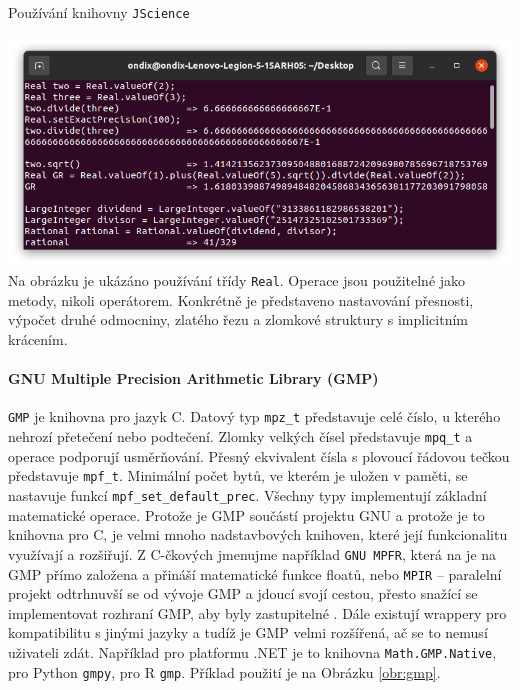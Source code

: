 \begin{myfigure}{}
\caption{Používání knihovny \texttt{JScience}}
\includegraphics[width=\linewidth]{./graphics/jscience.png}\label{obr:jscience}
Na obrázku je ukázáno používání třídy \texttt{Real}. Operace jsou použitelné jako metody, nikoli operátorem. Konkrétně je představeno nastavování přesnosti, výpočet druhé odmocniny, zlatého řezu a zlomkové struktury s implicitním krácením.
\end{myfigure}

\paragraph{GNU Multiple Precision Arithmetic Library \cite{wiki:gmp} (GMP)}
\texttt{GMP} je knihovna pro jazyk C. Datový typ \texttt{mpz\_t} představuje celé číslo, u kterého nehrozí přetečení nebo podtečení. Zlomky velkých čísel představuje \texttt{mpq\_t} a operace podporují usměrňování. Přesný ekvivalent čísla s plovoucí řádovou tečkou představuje \texttt{mpf\_t}. Minimální počet bytů, ve kterém je uložen v paměti, se nastavuje funkcí \texttt{mpf\_set\_default\_prec}. Všechny typy implementují základní matematické operace. Protože je GMP součástí projektu GNU a protože je to knihovna pro C, je velmi mnoho nadstavbových knihoven, které její funkcionalitu využívají a rozšiřují. Z C-čkových jmenujme například \texttt{GNU MPFR}, která na je na GMP přímo založena \cite{wiki:mpfr} a přináší matematické funkce floatů, nebo \texttt{MPIR} -- paralelní projekt odtrhnuvší se od vývoje GMP a jdoucí svojí cestou, přesto snažící se implementovat rozhraní GMP, aby byly zastupitelné \cite{wiki:mpir}. Dále existují wrappery pro kompatibilitu s jinými jazyky a tudíž je GMP velmi rozšířená, ač se to nemusí uživateli zdát. Například pro platformu .NET je to knihovna \texttt{Math.GMP.Native}, pro Python \texttt{gmpy}, pro R \texttt{gmp}. Příklad použití je na Obrázku \ref{obr:gmp}.

